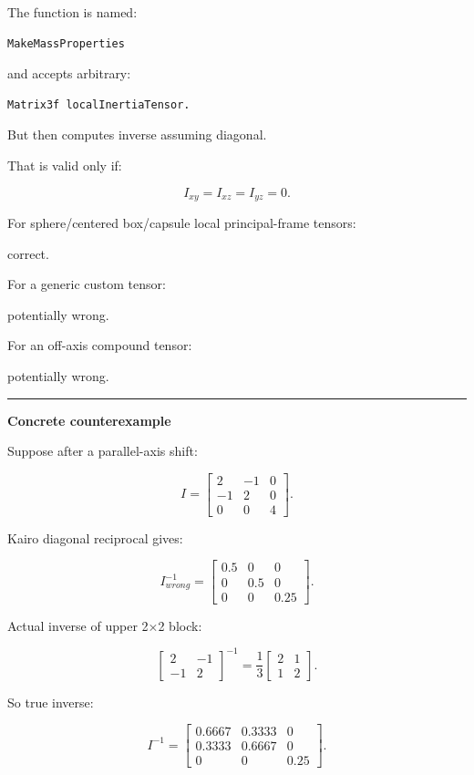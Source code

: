 The function is named:

\begin{verbatim}
MakeMassProperties
\end{verbatim}

and accepts arbitrary:

\begin{verbatim}
Matrix3f localInertiaTensor.
\end{verbatim}

But then computes inverse assuming diagonal.

That is valid only if:

\[
I_{xy}=I_{xz}=I_{yz}=0.
\]

For sphere/centered box/capsule local principal-frame tensors:

correct.

For a generic custom tensor:

potentially wrong.

For an off-axis compound tensor:

potentially wrong.

\begin{center}\rule{0.5\linewidth}{0.5pt}\end{center}

\textbf{Concrete counterexample}

Suppose after a parallel-axis shift:

\[
I=
\begin{bmatrix}
2&-1&0\\
-1&2&0\\
0&0&4
\end{bmatrix}.
\]

Kairo diagonal reciprocal gives:

\[
I^{-1}_{wrong}
=
\begin{bmatrix}
0.5&0&0\\
0&0.5&0\\
0&0&0.25
\end{bmatrix}.
\]

Actual inverse of upper 2×2 block:

\[
\begin{bmatrix}
2&-1\\
-1&2
\end{bmatrix}^{-1}
=
\frac13
\begin{bmatrix}
2&1\\
1&2
\end{bmatrix}.
\]

So true inverse:

\[
I^{-1}
=
\begin{bmatrix}
0.6667&0.3333&0\\
0.3333&0.6667&0\\
0&0&0.25
\end{bmatrix}.
\]

